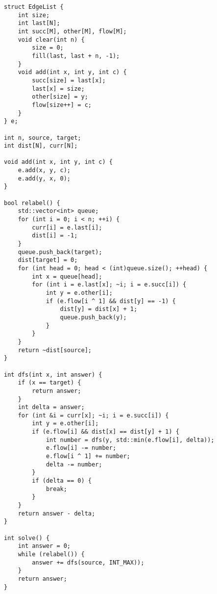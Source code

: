 \begin{lstlisting}
struct EdgeList {
    int size;
    int last[N];
    int succ[M], other[M], flow[M];
    void clear(int n) {
        size = 0;
        fill(last, last + n, -1);
    }
    void add(int x, int y, int c) {
        succ[size] = last[x];
        last[x] = size;
        other[size] = y;
        flow[size++] = c;
    }
} e;

int n, source, target;
int dist[N], curr[N];

void add(int x, int y, int c) {
    e.add(x, y, c);
    e.add(y, x, 0);
}

bool relabel() {
    std::vector<int> queue;
    for (int i = 0; i < n; ++i) {
        curr[i] = e.last[i];
        dist[i] = -1;
    }
    queue.push_back(target);
    dist[target] = 0;
    for (int head = 0; head < (int)queue.size(); ++head) {
        int x = queue[head];
        for (int i = e.last[x]; ~i; i = e.succ[i]) {
            int y = e.other[i];
            if (e.flow[i ^ 1] && dist[y] == -1) {
                dist[y] = dist[x] + 1;
                queue.push_back(y);
            }
        }
    }
    return ~dist[source];
}

int dfs(int x, int answer) {
    if (x == target) {
        return answer;
    }
    int delta = answer;
    for (int &i = curr[x]; ~i; i = e.succ[i]) {
        int y = e.other[i];
        if (e.flow[i] && dist[x] == dist[y] + 1) {
            int number = dfs(y, std::min(e.flow[i], delta));
            e.flow[i] -= number;
            e.flow[i ^ 1] += number;
            delta -= number;
        }
        if (delta == 0) {
            break;
        }
    }
    return answer - delta;
}

int solve() {
    int answer = 0;
    while (relabel()) {
        answer += dfs(source, INT_MAX));
    }
    return answer;
}
\end{lstlisting}

